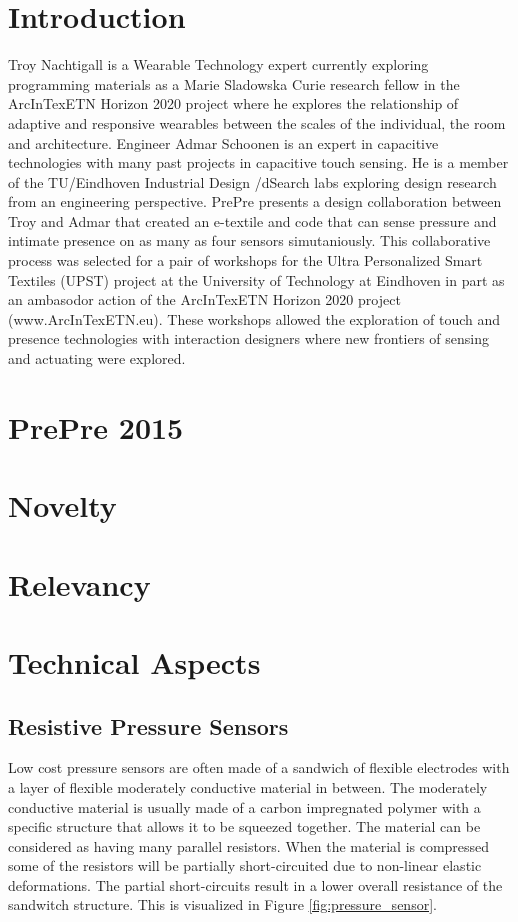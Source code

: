 \documentclass{sigchi-ext}
\begin{document}
\section{Introduction}
Troy Nachtigall is a Wearable Technology expert currently exploring programming materials as a Marie Sladowska Curie research fellow in the ArcInTexETN Horizon 2020 project where he explores the relationship of adaptive and responsive wearables between the scales of the individual, the room and architecture. Engineer Admar Schoonen is an expert in capacitive technologies with many past projects in capacitive touch sensing.  He is a member of the TU/Eindhoven Industrial Design /dSearch labs exploring design research from an engineering perspective.  PrePre presents a design collaboration between Troy and Admar that created an e-textile and code that can sense pressure and intimate presence on as many as four sensors simutaniously.  This collaborative process was selected for a pair of workshops for the Ultra Personalized Smart Textiles (UPST) project at the University of Technology at Eindhoven in part as an ambasodor action of the ArcInTexETN Horizon 2020 project (www.ArcInTexETN.eu). These workshops allowed the exploration of touch and presence technologies with interaction designers where new frontiers of sensing and actuating were explored.  
\section{PrePre 2015}

\section{Novelty}

\section{Relevancy}

\section{Technical Aspects}
\subsection{Resistive Pressure Sensors}
Low cost pressure sensors are often made of a sandwich of flexible electrodes
with a layer of flexible moderately conductive material in between. The
moderately conductive material is usually made of a carbon impregnated polymer
with a specific structure that allows it to be squeezed together. The material
can be considered as having many parallel resistors. When the material is
compressed some of the resistors will be partially short-circuited due to
non-linear elastic deformations. The partial short-circuits result in a lower
overall resistance of the sandwitch structure. This is visualized
in Figure \ref{fig:pressure_sensor}.
\end{document}
